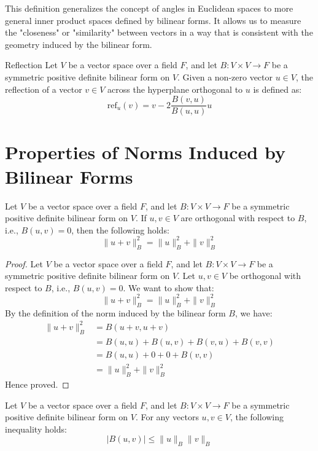 \documentclass[openany]{book}
\begin{document}
This definition generalizes the concept of angles in Euclidean spaces to more general inner product spaces defined by bilinear forms. It allows us to measure the "closeness" or "similarity" between vectors in a way that is consistent with the geometry induced by the bilinear form.
\begin{mydefinition}{Reflection}
Let $V$ be a vector space over a field $F$, and let $B: V \times V \to F$ be a symmetric positive definite bilinear form on $V$. Given a non-zero vector $u \in V$, the reflection of a vector $v \in V$ across the hyperplane orthogonal to $u$ is defined as:
$$\text{ref}_u(v) = v - 2 \frac{B(v, u)}{B(u, u)} u$$
\end{mydefinition}
\section{Properties of Norms Induced by Bilinear Forms}
\begin{mytheorem}
Let $V$ be a vector space over a field $F$, and let $B: V \times V \to F$ be a symmetric positive definite bilinear form on $V$. If $u, v \in V$ are orthogonal with respect to $B$, i.e., $B(u, v) = 0$, then the following holds:
$$\|u + v\|_B^2 = \|u\|_B^2 + \|v\|_B^2$$
\end{mytheorem}
\begin{proof}
Let $V$ be a vector space over a field $F$, and let $B: V \times V \to F$ be a symmetric positive definite bilinear form on $V$. Let $u, v \in V$ be orthogonal with respect to $B$, i.e., $B(u, v) = 0$. We want to show that:
$$\|u + v\|_B^2 = \|u\|_B^2 + \|v\|_B^2$$
By the definition of the norm induced by the bilinear form $B$, we have:
\[\begin{aligned}
\|u + v\|_B^2 &= B(u + v, u + v) \\
&= B(u, u) + B(u, v) + B(v, u) + B(v, v) \\
&= B(u, u) + 0 + 0 + B(v, v) \\
&= \|u\|_B^2 + \|v\|_B^2
\end{aligned}\]
Hence proved. 
\end{proof}
\begin{mytheorem}
Let $V$ be a vector space over a field $F$, and let $B: V \times V \to F$ be a symmetric positive definite bilinear form on $V$. For any vectors $u, v \in V$, the following inequality holds:
$$|B(u, v)| \leq \|u\|_B \|v\|_B$$
\end{mytheorem}
\end{document}
